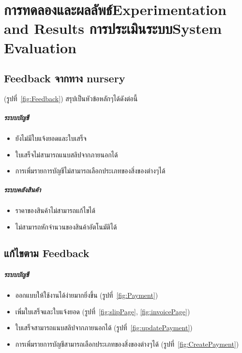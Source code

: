 \chapter{\ifproject%
\ifcpe การทดลองและผลลัพธ์\else Experimentation and Results\fi
\else%
\ifcpe การประเมินระบบ\else System Evaluation\fi
\fi}

\section{Feedback จากทาง nursery}
(รูปที่~\ref{fig:Feedback})
สรุปเป็นหัวข้อหลักๆได้ดังต่อนี้
\paragraph{ระบบบัญชี}
\begin{itemize}
    \item ยังไม่มีใบแจ้งยอดและใบเสร็จ
    \item ใบเสร็จไม่สามารถแนบสลิปจากภายนอกได้
    \item การเพิ่มรายการบัญชีไม่สามารถเลือกประเภทของสิ่งของต่างๆได้ 
\end{itemize}
\paragraph{ระบบคลังสินค้า}
\begin{itemize}
    \item ราคาของสินค้าไม่สามารถแก้ไขได้
    \item ไม่สามารถหักจำนวนของสินค้าอัตโนมัติได้
\end{itemize}

\section{แก้ไขตาม Feedback}
\paragraph{ระบบบัญชี}
\begin{itemize}
    \item ออกแบบให้ใช้งานได้ง่ายมากยิ่งขึ้น (รูปที่~\ref{fig:Payment})
    \item เพิ่มใบเสร็จและใบแจ้งยอด (รูปที่~\ref{fig:slipPage}, \ref{fig:invoicePage})
    \item ใบเสร็จสามารถแนบสลิปจากภายนอกได้ (รูปที่~\ref{fig:updatePayment})
    \item การเพิ่มรายการบัญชีสามารถเลือกประเภทของสิ่งของต่างๆได้ (รูปที่~\ref{fig:CreatePayment})
\end{itemize}
